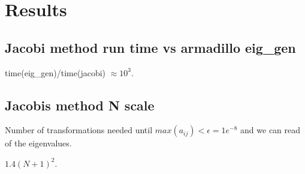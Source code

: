 \section{Results}


\subsection{Jacobi method run time vs armadillo eig_gen}

time(eig_gen)/time(jacobi) $\approx 10^{3}$.

\subsection{Jacobis method N scale}

Number of transformations needed until $max(a_{ij}) < \epsilon = 1e^{-8}$ and we
can read of the eigenvalues.

$1.4 (N+1)^2$.

